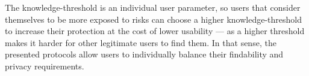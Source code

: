 The knowledge-threshold is an individual user parameter, so users that
consider themselves to be more exposed to risks can choose a higher
knowledge-threshold to increase their protection at the cost of lower
usability --- as a higher threshold makes it harder for other legitimate
users to find them.
In that sense, the presented protocols allow users to individually balance 
their findability and privacy requirements.

